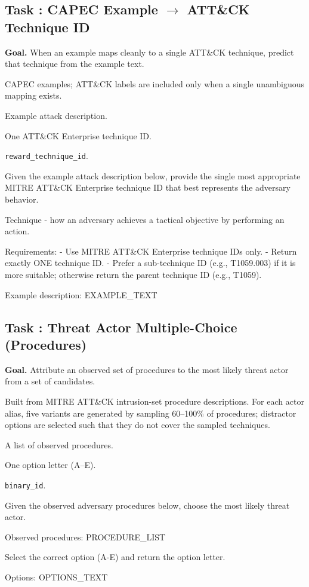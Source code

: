 \documentclass[11pt]{article}
\newcounter{task}
\newcommand{\tasksection}[1]{%
  \refstepcounter{task}%
  \subsection*{Task \thetask: #1}%
}
\newenvironment{taskmeta}{%
  \begin{description}[
      style=nextline,
      leftmargin=3.0cm,
      labelwidth=2.7cm,
      itemsep=0.15em,
      topsep=0.25em
  ]%
}{\end{description}}
\begin{document}
\tasksection{CAPEC Example $\rightarrow$ ATT\&CK Technique ID}
\textbf{Goal.} When an example maps cleanly to a single ATT\&CK technique, predict that technique from the example text.
\begin{taskmeta}
  \item[Source] CAPEC examples; ATT\&CK labels are included only when a single unambiguous mapping exists.
  \item[Input] Example attack description.
  \item[Output] One ATT\&CK Enterprise technique ID.
  \item[Reward] \texttt{reward\_technique\_id}.
\end{taskmeta}
\begin{promptbox}
Given the example attack description below, provide the single most appropriate MITRE ATT&CK Enterprise technique ID that best represents the adversary behavior.

Technique - how an adversary achieves a tactical objective by performing an action.

Requirements:
- Use MITRE ATT&CK Enterprise technique IDs only.
- Return exactly ONE technique ID.
- Prefer a sub-technique ID (e.g., T1059.003) if it is more suitable; otherwise return the parent technique ID (e.g., T1059).

Example description:
{EXAMPLE_TEXT}
\end{promptbox}


\tasksection{Threat Actor Multiple-Choice (Procedures)}
\textbf{Goal.} Attribute an observed set of procedures to the most likely threat actor from a set of candidates.
\begin{taskmeta}
  \item[Source] Built from MITRE ATT\&CK intrusion-set procedure descriptions. For each actor alias, five variants are generated by sampling 60--100\% of procedures; distractor options are selected such that they do not cover the sampled techniques.
  \item[Input] A list of observed procedures.
  \item[Output] One option letter (A--E).
  \item[Reward] \texttt{binary\_id}.
\end{taskmeta}
\begin{promptbox}
Given the observed adversary procedures below, choose the most likely threat actor.

Observed procedures:
{PROCEDURE_LIST}

Select the correct option (A-E) and return the option letter.

Options:
{OPTIONS_TEXT}
\end{promptbox}
\end{document}
